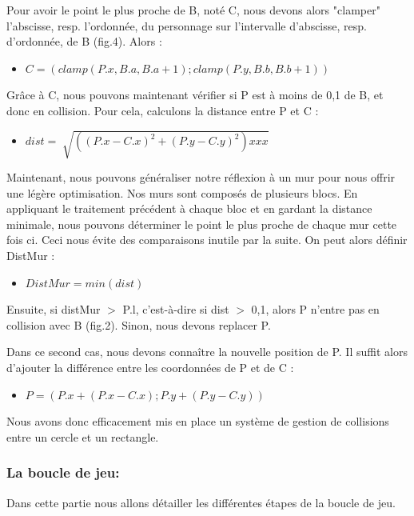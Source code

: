 \documentclass[12pt]{report}
\begin{document}
Pour avoir le point le plus proche de B, noté C, nous devons alors "clamper" 
l'abscisse, resp. l'ordonnée, du personnage sur l'intervalle d'abscisse, 
resp. d'ordonnée, de B (fig.4). Alors :

\begin{itemize}
	\item[] $C = (clamp(P.x, B.a, B.a +1) ; clamp(P.y, B.b, B.b +1))$
\end{itemize}

Grâce à C, nous pouvons maintenant vérifier si P est à moins de 0,1 de B, 
et donc en collision. Pour cela, calculons la distance entre P et C :
\begin{itemize}
	\item[] $dist = \sqrt[]{((P.x - C.x)^2 + (P.y - C.y)^2) xx  x}$
\end{itemize}

Maintenant, nous pouvons généraliser notre réflexion à un mur pour nous 
offrir une légère optimisation. Nos murs sont composés de plusieurs blocs. 
En appliquant le traitement précédent à chaque bloc et en gardant la 
distance minimale, nous pouvons déterminer le point le plus proche de 
chaque mur cette fois ci. Ceci nous évite des comparaisons inutile par la 
suite. On peut alors définir DistMur :

\begin{itemize}
	\item[] $DistMur = min(dist)$
\end{itemize}


Ensuite, si distMur $>$ P.l, c'est-à-dire si dist $>$ 0,1, alors P n'entre pas 
en collision avec B (fig.2). Sinon, nous devons replacer P.

Dans ce second cas, nous devons connaître la nouvelle position de P. Il 
suffit alors d'ajouter la différence entre les coordonnées de P et de C :

\begin{itemize}
	\item[] $P = (P.x + (P.x - C.x) ; P.y + (P.y - C.y))$
\end{itemize}

Nous avons donc efficacement mis en place un système de gestion de 
collisions entre un cercle et un rectangle.


\subsubsection{La boucle de jeu:}
Dans cette partie nous allons détailler les différentes étapes de la boucle de jeu.
\end{document}
